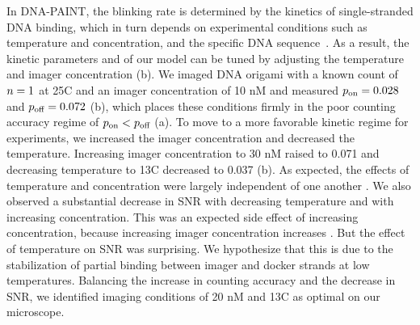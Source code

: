 In DNA-PAINT, the blinking rate is determined by the kinetics of single-stranded DNA binding,
which in turn depends on experimental conditions such as temperature and concentration, 
and the specific DNA sequence~\citep{jungmann_single-molecule_2010}.
	As a result, the kinetic parameters \pon and \poff of our model can be 
	tuned by adjusting the temperature and imager concentration (b).
	We imaged DNA origami with a known count of $n=1$ at 25\textdegree C and an 
	imager concentration of 10 nM and measured $p_\text{on}=0.028$ and $p_\text{off}=0.072$ 
	(b),
	which places these conditions firmly in the poor counting 
	accuracy regime of $p_\text{on} < p_\text{off}$ (a). %
	To move to a more favorable kinetic regime for experiments, 
	we increased the imager concentration and decreased the temperature.
	Increasing imager concentration to 30 nM raised \pon to 0.071 and 
	decreasing temperature to 13\textdegree C decreased \poff to 0.037 
	(b).
	As expected, the effects of temperature and concentration were largely independent 
	of one another \cite{jungmann_single-molecule_2010}.
	We also observed a substantial decrease in SNR with decreasing temperature 
	and with increasing concentration. 
	This was an expected side effect of increasing concentration, because increasing 
	imager concentration increases \rb.
	But the effect of temperature on SNR was surprising. 
	We hypothesize that this is due to the stabilization of partial 
	binding between imager and docker strands at low temperatures.
	Balancing the increase in counting accuracy and the decrease 
	in SNR, we identified imaging conditions of 20 nM and 13\textdegree C as 
	optimal on our microscope.

